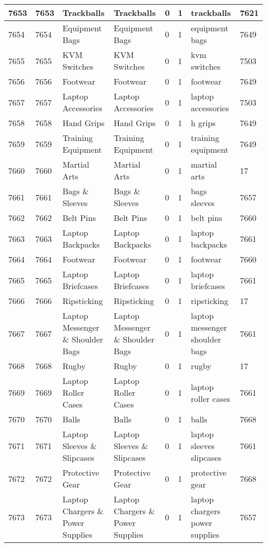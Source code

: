 \begin{longtable}{|l|l|l|l|l|l|l|l|}
7653 & 7653 & Trackballs & Trackballs & 0 & 1 & trackballs & 7621 \\ \hline 
7654 & 7654 & Equipment Bags & Equipment Bags & 0 & 1 & equipment bags & 7649 \\ \hline 
7655 & 7655 & KVM Switches & KVM Switches & 0 & 1 & kvm switches & 7503 \\ \hline 
7656 & 7656 & Footwear & Footwear & 0 & 1 & footwear & 7649 \\ \hline 
7657 & 7657 & Laptop Accessories & Laptop Accessories & 0 & 1 & laptop accessories & 7503 \\ \hline 
7658 & 7658 & Hand Grips & Hand Grips & 0 & 1 & h grips & 7649 \\ \hline 
7659 & 7659 & Training Equipment & Training Equipment & 0 & 1 & training equipment & 7649 \\ \hline 
7660 & 7660 & Martial Arts & Martial Arts & 0 & 1 & martial arts & 17 \\ \hline 
7661 & 7661 & Bags \& Sleeves & Bags \& Sleeves & 0 & 1 & bags sleeves & 7657 \\ \hline 
7662 & 7662 & Belt Pins & Belt Pins & 0 & 1 & belt pins & 7660 \\ \hline 
7663 & 7663 & Laptop Backpacks & Laptop Backpacks & 0 & 1 & laptop backpacks & 7661 \\ \hline 
7664 & 7664 & Footwear & Footwear & 0 & 1 & footwear & 7660 \\ \hline 
7665 & 7665 & Laptop Briefcases & Laptop Briefcases & 0 & 1 & laptop briefcases & 7661 \\ \hline 
7666 & 7666 & Ripsticking & Ripsticking & 0 & 1 & ripsticking & 17 \\ \hline 
7667 & 7667 & Laptop Messenger \& Shoulder Bags & Laptop Messenger \& Shoulder Bags & 0 & 1 & laptop messenger shoulder bags & 7661 \\ \hline 
7668 & 7668 & Rugby & Rugby & 0 & 1 & rugby & 17 \\ \hline 
7669 & 7669 & Laptop Roller Cases & Laptop Roller Cases & 0 & 1 & laptop roller cases & 7661 \\ \hline 
7670 & 7670 & Balls & Balls & 0 & 1 & balls & 7668 \\ \hline 
7671 & 7671 & Laptop Sleeves \& Slipcases & Laptop Sleeves \& Slipcases & 0 & 1 & laptop sleeves slipcases & 7661 \\ \hline 
7672 & 7672 & Protective Gear & Protective Gear & 0 & 1 & protective gear & 7668 \\ \hline 
7673 & 7673 & Laptop Chargers \& Power Supplies & Laptop Chargers \& Power Supplies & 0 & 1 & laptop chargers power supplies & 7657 \\ \hline 

\end{longtable}
